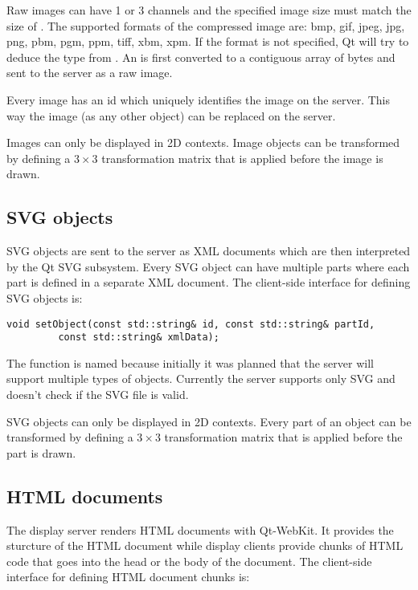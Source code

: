 Raw images can have 1 or 3 channels and the specified image size must match the
size of . The supported formats of the compressed image are: bmp,
gif, jpeg, jpg, png, pbm, pgm, ppm, tiff, xbm, xpm. If the format is not
specified, Qt will try to deduce the type from . An 
is first converted to a contiguous array of bytes and sent to the server as a
raw image.
 
Every image has an id which uniquely identifies the image on the server. This
way the image (as any other object) can be replaced on the server.

Images can only be displayed in 2D contexts. Image objects can be transformed
by defining a $3 \times 3$ transformation matrix that is applied before
the image is drawn.

\subsection{SVG objects}

SVG objects are sent to the server as XML documents which are then interpreted
by the Qt SVG subsystem. Every SVG object can have multiple parts where each
part is defined in a separate XML document.
The client-side interface for defining SVG objects is:

\begin{Verbatim}[fontsize=\scriptsize,gobble=3]
   void setObject(const std::string& id, const std::string& partId,
         const std::string& xmlData); 
\end{Verbatim}

The function is named  because initially it was planned that
the server will support multiple types of objects. Currently the server
supports only SVG and doesn't check if the SVG file is valid.

SVG objects can only be displayed in 2D contexts. Every part of an object can
be transformed by defining a $3 \times 3$ transformation matrix that is applied
before the part is drawn.

\subsection{HTML documents}

The display server renders HTML documents with Qt-WebKit. It provides the
sturcture of the HTML document while display clients provide chunks of
HTML code that goes into the head or the body of the document.
The client-side interface for defining HTML document chunks is:

